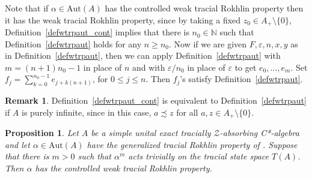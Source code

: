 \documentclass[11pt]{amsart}
\theoremstyle{plain}
\newtheorem{proposition}[theorem]{Proposition}
\theoremstyle{definition}
\newtheorem{remark}[theorem]{Remark}
\theoremstyle{remark}
\numberwithin{equation}{section}
\newcommand{\af}{\alpha}
\begin{document}
Note that if $\alpha \in \mathrm{Aut} (A)$ has 
the controlled weak tracial Rokhlin property then it
has the  weak tracial Rokhlin property, since by
taking a fixed $z_0\in A_+\setminus \{0\}$,
Definition~\ref{defwtrpaut_cont} implies that there
is $n_0\in\mathbb{N}$ such that Definition~\ref{defwtrpaut}
holds for any $n\geq n_0$. Now if we are given 
$F,\varepsilon,n,x,y$ as in Definition~\ref{defwtrpaut},
then we can apply Definition~\ref{defwtrpaut} 
 with $m=(n+1)n_0 -1$ in place
of $n$ and with $\varepsilon/n_0$ in place of $\varepsilon$
to get $e_0,\ldots,e_m$. Set $f_j=\sum_{k=0}^{n_0 -1} e_{j+k(n+1)}$,
for $0\leq j\leq n$. Then $f_j$'s satisfy Definition~\ref{defwtrpaut}.

\begin{remark}\label{rmk_cwtrp}
Definition~\ref{defwtrpaut_cont}
is equivalent to Definition~\ref{defwtrpaut} if $A$ is purely infinite,
since in this case, $a\precsim z$ for all $a,z\in A_+\setminus \{0\}$.
\end{remark}

\begin{proposition}\label{P_8616_GenToWeakControl}
Let $A$ be a  simple unital exact
tracially $\mathcal{Z}$-absorbing C*-algebra
and let $\alpha \in \mathrm{Aut} (A)$
have the generalized tracial Rokhlin property
of \cite[Definition 6.1]{HO13}.
Suppose that there is $m > 0$ such that $\af^m$
acts trivially on the tracial state space $T (A)$.
Then $\alpha$ has the controlled weak tracial Rokhlin property.
\end{proposition}
\end{document}

